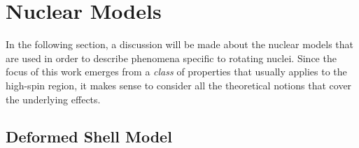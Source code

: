 


\section{Nuclear Models}
\label{section-nuclear-models}

In the following section, a discussion will be made about the nuclear models that are used in order to describe phenomena specific to rotating nuclei. Since the focus of this work emerges from a \emph{class} of properties that usually applies to the high-spin region, it makes sense to consider all the theoretical notions that cover the underlying effects.

\subsection{Deformed Shell Model}

